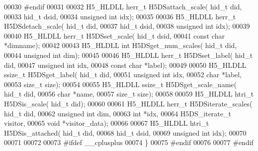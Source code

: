 \begin{DoxyCode}
00030 \textcolor{preprocessor}{#endif}
00031 
00032 H5\_HLDLL herr\_t  H5DSattach\_scale( hid\_t did,
00033                         hid\_t dsid,
00034                         \textcolor{keywordtype}{unsigned} \textcolor{keywordtype}{int} idx);
00035 
00036 H5\_HLDLL herr\_t  H5DSdetach\_scale( hid\_t did,
00037                         hid\_t dsid,
00038                         \textcolor{keywordtype}{unsigned} \textcolor{keywordtype}{int} idx);
00039 
00040 H5\_HLDLL herr\_t  H5DSset\_scale( hid\_t dsid,
00041                      \textcolor{keyword}{const} \textcolor{keywordtype}{char} *dimname);
00042 
00043 H5\_HLDLL \textcolor{keywordtype}{int} H5DSget\_num\_scales( hid\_t did,
00044                        \textcolor{keywordtype}{unsigned} \textcolor{keywordtype}{int} dim);
00045 
00046 H5\_HLDLL herr\_t  H5DSset\_label( hid\_t did,
00047                      \textcolor{keywordtype}{unsigned} \textcolor{keywordtype}{int} idx,
00048                      \textcolor{keyword}{const} \textcolor{keywordtype}{char} *label);
00049 
00050 H5\_HLDLL ssize\_t H5DSget\_label( hid\_t did,
00051                       \textcolor{keywordtype}{unsigned} \textcolor{keywordtype}{int} idx,
00052                       \textcolor{keywordtype}{char} *label,
00053                       \textcolor{keywordtype}{size\_t} size);
00054 
00055 H5\_HLDLL ssize\_t H5DSget\_scale\_name( hid\_t did,
00056                            \textcolor{keywordtype}{char} *name,
00057                            \textcolor{keywordtype}{size\_t} size);
00058 
00059 H5\_HLDLL htri\_t H5DSis\_scale( hid\_t did);
00060 
00061 H5\_HLDLL herr\_t  H5DSiterate\_scales( hid\_t did,
00062                           \textcolor{keywordtype}{unsigned} \textcolor{keywordtype}{int} dim,
00063                           \textcolor{keywordtype}{int} *idx,
00064                           H5DS\_iterate\_t visitor,
00065                           \textcolor{keywordtype}{void} *visitor\_data);
00066 
00067 H5\_HLDLL htri\_t H5DSis\_attached( hid\_t did,
00068                        hid\_t dsid,
00069                        \textcolor{keywordtype}{unsigned} \textcolor{keywordtype}{int} idx);
00070 
00071 
00072 
00073 \textcolor{preprocessor}{#ifdef \_\_cplusplus}
00074 \}
00075 \textcolor{preprocessor}{#endif}
00076 
00077 \textcolor{preprocessor}{#endif}
\end{DoxyCode}
